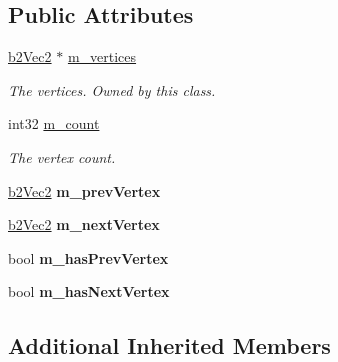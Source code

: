 \subsection*{Public Attributes}
\begin{DoxyCompactItemize}
\item 
\hyperlink{structb2_vec2}{b2\+Vec2} $\ast$ \hyperlink{classb2_chain_shape_a481116a6886fb3880b13e55c966579da}{m\+\_\+vertices}\hypertarget{classb2_chain_shape_a481116a6886fb3880b13e55c966579da}{}\label{classb2_chain_shape_a481116a6886fb3880b13e55c966579da}

\begin{DoxyCompactList}\small\item\em The vertices. Owned by this class. \end{DoxyCompactList}\item 
int32 \hyperlink{classb2_chain_shape_ab2ad711781e6ac81179074e90e0e058b}{m\+\_\+count}\hypertarget{classb2_chain_shape_ab2ad711781e6ac81179074e90e0e058b}{}\label{classb2_chain_shape_ab2ad711781e6ac81179074e90e0e058b}

\begin{DoxyCompactList}\small\item\em The vertex count. \end{DoxyCompactList}\item 
\hyperlink{structb2_vec2}{b2\+Vec2} {\bfseries m\+\_\+prev\+Vertex}\hypertarget{classb2_chain_shape_a3a42d4c6b2421bc5badda3b6164949cf}{}\label{classb2_chain_shape_a3a42d4c6b2421bc5badda3b6164949cf}

\item 
\hyperlink{structb2_vec2}{b2\+Vec2} {\bfseries m\+\_\+next\+Vertex}\hypertarget{classb2_chain_shape_af3716ef780dd5bcd905e350d8854aaa2}{}\label{classb2_chain_shape_af3716ef780dd5bcd905e350d8854aaa2}

\item 
bool {\bfseries m\+\_\+has\+Prev\+Vertex}\hypertarget{classb2_chain_shape_a8a6ffbb9de0e2b8545c8b4fc8aa77249}{}\label{classb2_chain_shape_a8a6ffbb9de0e2b8545c8b4fc8aa77249}

\item 
bool {\bfseries m\+\_\+has\+Next\+Vertex}\hypertarget{classb2_chain_shape_a333b74486566e73c3cf1f7da5e69a96e}{}\label{classb2_chain_shape_a333b74486566e73c3cf1f7da5e69a96e}

\end{DoxyCompactItemize}
\subsection*{Additional Inherited Members}


